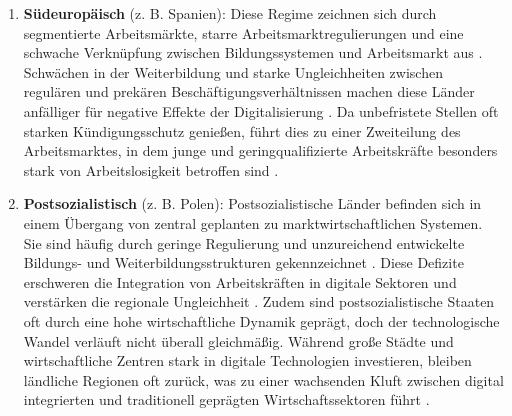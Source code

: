 \begin{enumerate}

    \item \textbf{Südeuropäisch} (z. B. Spanien): Diese Regime zeichnen sich durch 
    segmentierte Arbeitsmärkte, starre Arbeitsmarktregulierungen und eine schwache 
    Verknüpfung zwischen Bildungssystemen und Arbeitsmarkt aus 
    \parencite[S. 19]{ferrera1996thesouthern}. Schwächen in der Weiterbildung 
    und starke Ungleichheiten zwischen regulären und prekären Beschäftigungsverhältnissen 
    machen diese Länder anfälliger für negative Effekte der Digitalisierung 
    \parencite[S. 19–20]{ferrera1996thesouthern}. Da unbefristete Stellen oft starken 
    Kündigungsschutz genießen, führt dies zu einer Zweiteilung des Arbeitsmarktes, in dem 
    junge und geringqualifizierte Arbeitskräfte besonders stark von Arbeitslosigkeit 
    betroffen sind \parencite[S. 19–21]{ferrera1996thesouthern}.
    
    \item \textbf{Postsozialistisch} (z. B. Polen): Postsozialistische Länder befinden sich 
    in einem Übergang von zentral geplanten zu marktwirtschaftlichen Systemen. Sie sind 
    häufig durch geringe Regulierung und unzureichend entwickelte Bildungs- und 
    Weiterbildungsstrukturen gekennzeichnet \parencite[S. 88–93]{cerami2006socialpolicy}. 
    Diese Defizite erschweren die Integration von Arbeitskräften in digitale Sektoren und 
    verstärken die regionale Ungleichheit \parencite[S. 88–93]{cerami2006socialpolicy}. 
    Zudem sind postsozialistische Staaten oft durch eine hohe wirtschaftliche Dynamik 
    geprägt, doch der technologische Wandel verläuft nicht überall gleichmäßig. Während 
    große Städte und wirtschaftliche Zentren stark in digitale Technologien investieren, 
    bleiben ländliche Regionen oft zurück, was zu einer wachsenden Kluft zwischen digital 
    integrierten und traditionell geprägten Wirtschaftssektoren führt 
    \parencite[S. 90]{cerami2006socialpolicy}.
    
\end{enumerate}

